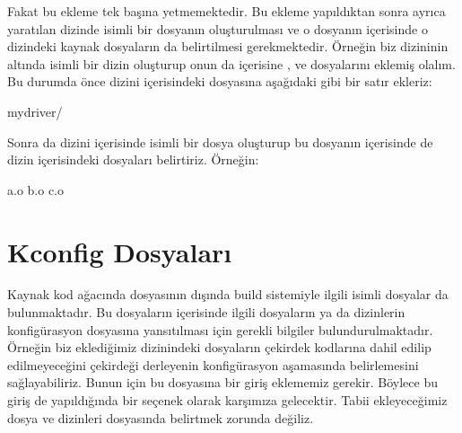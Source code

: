 \documentclass[a4paper,10pt,turkish]{sphinxmanual}
\begin{document}
\sphinxAtStartPar
Fakat bu ekleme tek başına yetmemektedir. Bu ekleme yapıldıktan sonra ayrıca yaratılan dizinde 
isimli bir dosyanın oluşturulması ve o dosyanın içerisinde o dizindeki kaynak dosyaların da belirtilmesi
gerekmektedir. Örneğin biz  dizininin altında  isimli bir dizin oluşturup onun da
içerisine ,  ve  dosyalarını eklemiş olalım. Bu durumda önce  dizini
içerisindeki  dosyasına aşağıdaki gibi bir satır ekleriz:

\begin{sphinxVerbatim}[commandchars=\\\{\}]
mydriver/
\end{sphinxVerbatim}

\sphinxAtStartPar
Sonra da  dizini içerisinde  isimli bir dosya oluşturup bu dosyanın içerisinde
de dizin içerisindeki dosyaları belirtiriz. Örneğin:

\begin{sphinxVerbatim}[commandchars=\\\{\}]
a.o
b.o
c.o
\end{sphinxVerbatim}


\section{Kconfig Dosyaları}
\label{\detokenize{kernelcompilation:kconfig-dosyalari}}
\sphinxAtStartPar
Kaynak kod ağacında  dosyasının dışında build sistemiyle ilgili  isimli dosyalar
da bulunmaktadır. Bu dosyaların içerisinde ilgili dosyaların ya da dizinlerin konfigürasyon dosyasına
yansıtılması için gerekli bilgiler bulundurulmaktadır. Örneğin biz eklediğimiz  dizinindeki
dosyaların çekirdek kodlarına dahil edilip edilmeyeceğini çekirdeği derleyenin konfigürasyon aşamasında
belirlemesini sağlayabiliriz. Bunun için bu  dosyasına bir giriş eklememiz gerekir. Böylece
bu giriş de  yapıldığında bir seçenek olarak karşımıza gelecektir. Tabii ekleyeceğimiz
dosya ve dizinleri  dosyasında belirtmek zorunda değiliz.
\end{document}
